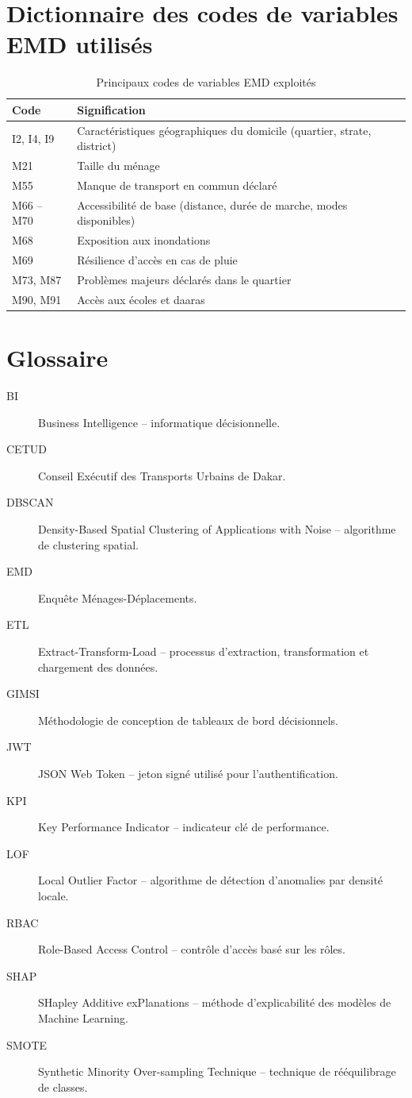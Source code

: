 \section{Dictionnaire des codes de variables EMD utilisés}
\begin{table}[H]
\centering
\caption{Principaux codes de variables EMD exploités}
\begin{tabular}{ll}
\toprule
\textbf{Code} & \textbf{Signification} \\
\midrule
I2, I4, I9 & Caractéristiques géographiques du domicile (quartier, strate, district) \\
M21 & Taille du ménage \\
M55 & Manque de transport en commun déclaré \\
M66 -- M70 & Accessibilité de base (distance, durée de marche, modes disponibles) \\
M68 & Exposition aux inondations \\
M69 & Résilience d'accès en cas de pluie \\
M73, M87 & Problèmes majeurs déclarés dans le quartier \\
M90, M91 & Accès aux écoles et daaras \\
\bottomrule
\end{tabular}
\end{table}

\section{Glossaire}
\begin{description}
\item[BI] Business Intelligence -- informatique décisionnelle.
\item[CETUD] Conseil Exécutif des Transports Urbains de Dakar.
\item[DBSCAN] Density-Based Spatial Clustering of Applications with Noise -- algorithme de clustering spatial.
\item[EMD] Enquête Ménages-Déplacements.
\item[ETL] Extract-Transform-Load -- processus d'extraction, transformation et chargement des données.
\item[GIMSI] Méthodologie de conception de tableaux de bord décisionnels.
\item[JWT] JSON Web Token -- jeton signé utilisé pour l'authentification.
\item[KPI] Key Performance Indicator -- indicateur clé de performance.
\item[LOF] Local Outlier Factor -- algorithme de détection d'anomalies par densité locale.
\item[RBAC] Role-Based Access Control -- contrôle d'accès basé sur les rôles.
\item[SHAP] SHapley Additive exPlanations -- méthode d'explicabilité des modèles de Machine Learning.
\item[SMOTE] Synthetic Minority Over-sampling Technique -- technique de rééquilibrage de classes.
\end{description}

